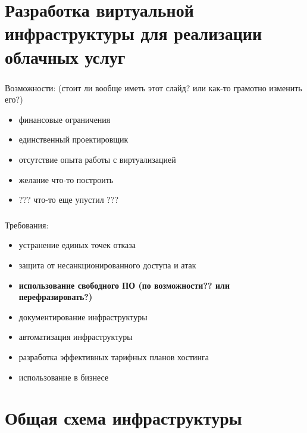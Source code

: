 
\frame[plain]{\titlepage} %


\section{Разработка виртуальной инфраструктуры для реализации облачных услуг}

\begin{frame}
\frametitle{\insertsection}
Возможности: (стоит ли вообще иметь этот слайд? или как-то грамотно изменить его?)
\begin{itemize}
	\item финансовые ограничения
	\item единственный проектировщик
	\item отсутствие опыта работы с виртуализацией
	\item желание что-то построить
	\item ??? что-то еще упустил ???
\end{itemize}
\end{frame}

\begin{frame}
\frametitle{\insertsection}
Требования:
\begin{itemize}
	\item устранение единых точек отказа %
	\item защита от несанкционированного доступа и атак %
	\item \textbf{использование свободного ПО (по возможности?? или перефразировать?)}
	\item документирование инфраструктуры
	\item автоматизация инфраструктуры
	\item разработка эффективных тарифных планов хостинга
	\item использование в бизнесе
\end{itemize}
\end{frame}


\section{Общая схема инфраструктуры}

